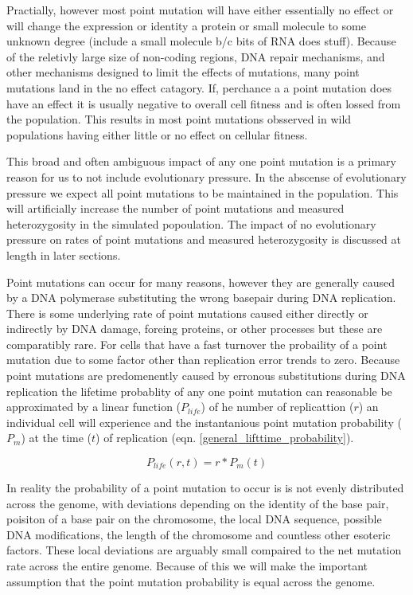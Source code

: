 \documentclass{article}
\begin{document}
    Practially, however most point mutation will have either essentially no effect  or will change the expression or identity a protein or small molecule to some unknown degree (include a small molecule b/c bits of RNA does stuff).  Because of the reletivly large size of non-coding regions, DNA repair mechanisms, and other mechanisms designed to limit the effects of mutations, many point mutations land in the no effect catagory.  If, perchance a a point mutation does have an effect it is usually negative to overall cell fitness and is often lossed from the population.  This results in most point mutations obsserved in wild populations having either little or no effect on cellular fitness. 
    
    This broad and often ambiguous impact of any one point mutation is a primary reason for us to not include evolutionary pressure. In the abscense of evolutionary pressure we expect all point mutations to be maintained in the population.  This will artificially increase the number of point mutations and measured heterozygosity in the simulated popoulation.  The impact of no evolutionary pressure on rates of point mutations and measured heterozygosity is discussed at length in later sections.

    Point mutations can occur for many reasons, however they are generally caused by a DNA polymerase substituting the wrong basepair during DNA replication.  There is some underlying rate of point mutations caused either directly or indirectly by DNA damage, foreing proteins, or other processes but these are comparatibly rare.  For cells that have a fast turnover the probaility of a point mutation due to some factor other than replication error trends to zero.  Because point mutations are predomenently caused by erronous substitutions during DNA replication the lifetime probablity of any one point mutation can reasonable be approximated by a linear function (\(P_{life}\)) of he number of replicattion (\(r\)) an individual cell will experience and the instantanious point mutation probability (\(P_m\)) at the time (\(t\)) of replication (eqn. \ref{general_lifttime_probability}).

    \begin{equation}
        P_{life}(r, t) = r * P_m(t) \label{general_lifttime_probability}
    \end{equation}

    In reality the probability of a point mutation to occur is is not evenly distributed across the genome, with deviations depending on the identity of the base pair, poisiton of a base pair on the chromosome, the local DNA sequence, possible DNA modifications, the length of the chromosome and countless other esoteric factors.  These local deviations are arguably small compaired to the net mutation rate across the entire genome.  Because of this we will make the important assumption that the point mutation probability is equal across the genome.
\end{document}
